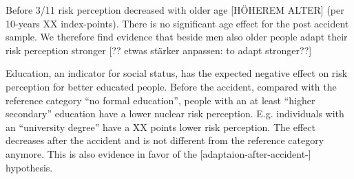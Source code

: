 
Before 3/11 risk perception decreased with older age [HÖHEREM ALTER] (per 10-years XX index-points). There is no significant age effect for the post accident sample. We therefore find evidence that beside men also older people adapt their risk perception stronger [?? etwas stärker anpassen: to adapt stronger??]   


Education, an indicator for social status, has the expected negative effect on risk perception for better educated people. Before the accident, compared with the reference category ``no formal education'', people with an at least ``higher secondary''  education have a lower nuclear risk perception. E.g. individuals with an ``university degree'' have a XX points lower risk perception. The effect decreases after the accident and is not different from the reference category anymore. This is also evidence in favor of the [adaptaion-after-accident-] hypothesis.


